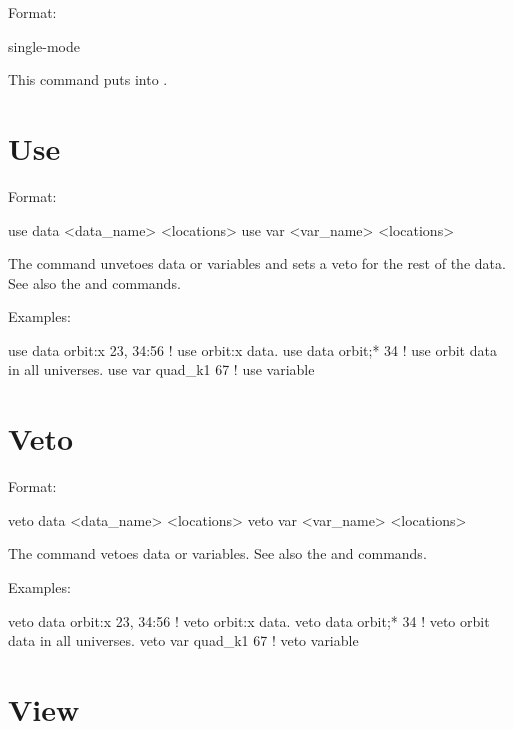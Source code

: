Format:
\begin{example}
  single-mode
\end{example}

\vskip 0.2in 
This command puts \tao into . 

\section{Use}
\label{s:use}

Format:
\begin{example}
  use data  <data_name> <locations>
  use var <var_name> <locations>
\end{example}

\vskip 0.2in 
The  command unvetoes data or variables and sets a veto for
the rest of the data. See also the  and 
commands.

Examples:
\begin{example}
  use data orbit:x  23, 34:56 ! use orbit:x data.
  use data orbit;* 34         ! use orbit data in all universes.
  use var quad_k1 67          ! use variable
\end{example}


\section{Veto}
\label{s:veto}

Format:
\begin{example}
  veto data <data_name> <locations>
  veto var <var_name> <locations>
\end{example}

\vskip 0.2in 
The  command vetoes data or variables. See also the
 and  commands.

Examples:
\begin{example}
  veto data orbit:x  23, 34:56 ! veto orbit:x data.
  veto data orbit;* 34         ! veto orbit data in all universes.
  veto var quad_k1 67          ! veto variable
\end{example}

\section{View}
\label{s:view}

